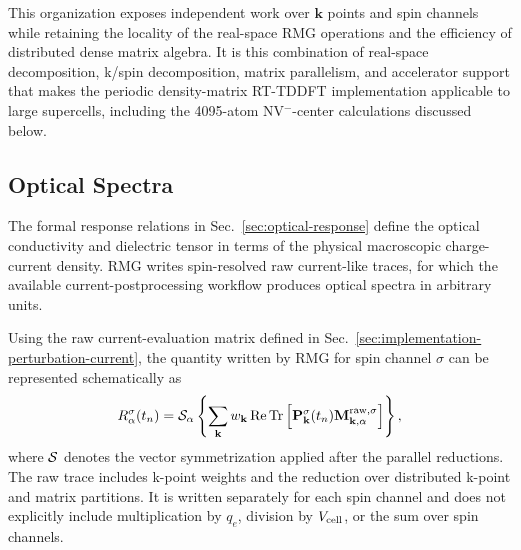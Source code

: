 This organization exposes independent work over $\mathbf k$ points and
spin channels while retaining the locality of the real-space RMG
operations and the efficiency of distributed dense matrix algebra.  It
is this combination of real-space decomposition, k/spin decomposition,
matrix parallelism, and accelerator support that makes the periodic
density-matrix RT-TDDFT implementation applicable to large supercells,
including the 4095-atom NV$^{-}$-center calculations discussed below.

\subsection{Optical Spectra}%
\label{sec:implementation-optical-processing}

The formal response relations in Sec.~\ref{sec:optical-response}
define the optical conductivity and dielectric tensor in terms of the
physical macroscopic charge-current density.  RMG writes
spin-resolved raw current-like traces, for which the available
current-postprocessing workflow produces optical spectra in arbitrary
units.

Using the raw current-evaluation matrix defined in
Sec.~\ref{sec:implementation-perturbation-current}, the quantity
written by RMG for spin channel $\sigma$ can be represented
schematically as
\begin{equation}
  R_\alpha^\sigma(t_n)
  =
  {\cal S}_\alpha
  \left\{
  \sum_{\mathbf k}
  w_{\mathbf k}\,
  {\rm Re}\,
  {\rm Tr}
  \left[
    \mathbf P_{\mathbf k}^{\sigma}(t_n)
    \mathbf M_{\mathbf k,\alpha}^{\rm raw,\sigma}
  \right]
  \right\},
  \label{eq:impl_raw_current_trace}
\end{equation}
where ${\cal S}$ denotes the vector symmetrization applied after the
parallel reductions.  The raw trace includes k-point weights and the
reduction over distributed k-point and matrix partitions.  It is
written separately for each spin channel and does not explicitly
include multiplication by $q_e$, division by $V_{\rm cell}$, or the
sum over spin channels.

